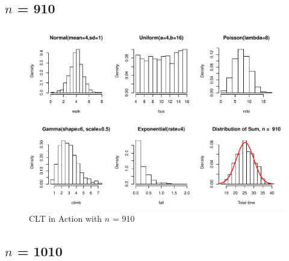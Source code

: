 \documentclass[11pt,letter]{article}\usepackage[]{graphicx}\usepackage[]{color}
\makeatletter
\def\maxwidth{ %
  \ifdim\Gin@nat@width>\linewidth
    \linewidth
  \else
    \Gin@nat@width
  \fi
}
\newenvironment{knitrout}{}{} %
\makeatother
\begin{document}
\subsection{$n$ = 910}

\begin{knitrout}
\color{fgcolor}\begin{figure}[h]

{\centering \includegraphics[width=\maxwidth]{figure/n-910-1} 

}

\caption[CLT in Action with ]{CLT in Action with $n$ = 910}\label{fig:n-910}
\end{figure}


\end{knitrout}
\newpage
\subsection{$n$ = 1010}
\end{document}
